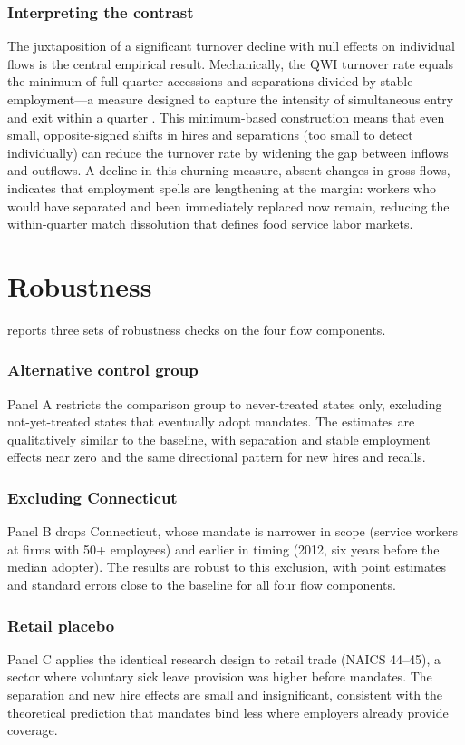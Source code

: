 \documentclass[12pt]{article}
\begin{document}
\subsubsection*{Interpreting the contrast} The juxtaposition of a significant turnover decline with null effects on individual flows is the central empirical result. Mechanically, the QWI turnover rate equals the minimum of full-quarter accessions and separations divided by stable employment---a measure designed to capture the intensity of simultaneous entry and exit within a quarter \citep{Burgess2000}. This minimum-based construction means that even small, opposite-signed shifts in hires and separations (too small to detect individually) can reduce the turnover rate by widening the gap between inflows and outflows. A decline in this churning measure, absent changes in gross flows, indicates that employment spells are lengthening at the margin: workers who would have separated and been immediately replaced now remain, reducing the within-quarter match dissolution that defines food service labor markets.


\section{Robustness}\label{sec:robustness}

 reports three sets of robustness checks on the four flow components.

\subsubsection*{Alternative control group} Panel A restricts the comparison group to never-treated states only, excluding not-yet-treated states that eventually adopt mandates. The estimates are qualitatively similar to the baseline, with separation and stable employment effects near zero and the same directional pattern for new hires and recalls.

\subsubsection*{Excluding Connecticut} Panel B drops Connecticut, whose mandate is narrower in scope (service workers at firms with 50+ employees) and earlier in timing (2012, six years before the median adopter). The results are robust to this exclusion, with point estimates and standard errors close to the baseline for all four flow components.

\subsubsection*{Retail placebo} Panel C applies the identical research design to retail trade (NAICS 44--45), a sector where voluntary sick leave provision was higher before mandates. The separation and new hire effects are small and insignificant, consistent with the theoretical prediction that mandates bind less where employers already provide coverage.
\end{document}
